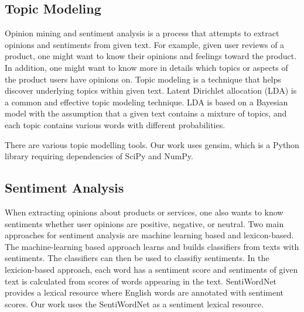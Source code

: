 

\subsection{Topic Modeling}

Opinion mining and sentiment analysis is a process that attempts to extract opinions and sentiments from given text\cite{surveyopinionmining}. For example, given user reviews of a product, one might want to know their opinions and feelings toward the product. In addition, one might want to know more in details which topics or aspects of the product users have opinions on. Topic modeling is a technique that helps discover underlying topics within given text. Latent Dirichlet allocation (LDA)\cite{LDA} is a common and effective topic modeling technique. LDA is based on a Bayesian model with the assumption that a given text contains a mixture of topics, and each topic contains various words with different probabilities.

There are various topic modelling tools. Our work uses gensim\cite{gensim}, which is a Python library requiring dependencies of SciPy and NumPy.

\subsection{Sentiment Analysis}

When extracting opinions about products or services, one also wants to know sentiments whether user opinions are positive, negative, or neutral. Two main approaches for sentiment analysis are machine learning based and lexicon-based. The machine-learning based approach learns and builds classifiers from texts with sentiments. The classifiers can then be used to classifiy sentiments. In the lexicion-based approach, each word has a sentiment score and sentiments of given text is calculated from scores of words appearing in the text. SentiWordNet~\cite{SentiWordNet} provides a lexical resource where English words are annotated with sentiment scores. Our work uses the SentiWordNet as a sentiment lexical resource.













